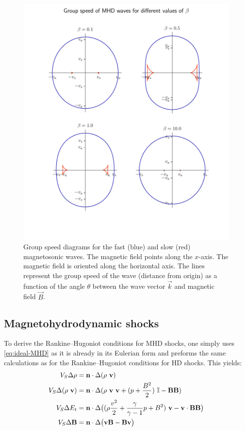 \begin{figure}[H]
	\centering
	\includegraphics[width=\linewidth]{images/MHD-group-speed.pdf}
	\caption{Group speed diagrams for the fast (blue) and slow (red) magnetosonic waves. The magnetic field points along the $x$-axis. The magnetic field is oriented along the horizontal axis. The lines represent the group speed of the wave (distance from origin) as a function of the angle $\theta$ between the wave vector $\vec{k}$ and magnetic field $\vec{B}$.}
	\label{fig:MHD-group-speed}
\end{figure}
\newpage

\subsection*{Magnetohydrodynamic shocks}

To derive the Rankine–Hugoniot conditions for MHD shocks, one simply uses \cref{eq:ideal-MHD} as it is already in its Eulerian form and preforms the same calculations as for the Rankine–Hugoniot conditions for HD shocks. 
This yields:
\begin{equation}
\label{eq:MHD-shock-conditions}
\begin{split}
V_S \Delta \rho &= \vec{n}\cdot\Delta(\rho \ \vec{v})\\
V_S \Delta (\rho \ \vec{v}) &= \vec{n} \cdot \Delta(\rho \ \vec{v} \ \vec{v} + (p + \frac{B^2}{2}) \ \I -  \vec{B}\vec{B}) \\
V_S \Delta E_t &= \vec{n} \cdot \Delta \big( (\rho \frac{v^2}{2} + \frac{\gamma}{\gamma - 1} p + B^2) \ \vec{v} - \vec{v} \cdot \vec{B} \vec{B} \big) \\
V_S \Delta \vec{B} &= \vec{n} \cdot \Delta \big( \vec{v} \vec{B} - \vec{B} \vec{v} \big)
\end{split}
\end{equation}

